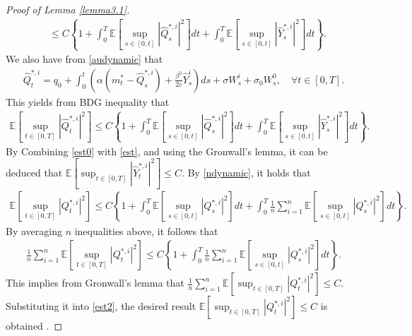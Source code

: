 \documentclass[11pt]{article}
\numberwithin{equation}{section}
\begin{document}
{\begin{proof}[Proof of Lemma \ref{lemma3.1}]
\begin{align}
&\leq C\left\{1+\int_0^T\mathbb{E}\left[\sup_{s\in [0,t]}|\hat{Q}_s^{*, i}|^2\right]dt+\int_0^T\mathbb{E}\left[\sup_{s\in [0,t]}|\hat{Y}_s^{*, i}|^2\right]dt\right\}.
\end{align}
We also have from \eqref{audynamic} that
\begin{align*}
\hat{Q}_t^{*,i}=q_0+\int_0^t\left(\alpha\left(m_t^*-\hat{Q}_s^{*, i}\right)+\frac{\beta ^2}{2c }\hat{Y}_s^ i\right)ds+\sigma  W_s^i+\sigma_0W_s^0,\quad \forall t\in[0,T].    
\end{align*}
This yields from BDG inequality that
\begin{align}\label{est}
\mathbb{E}\left[\sup_{t\in [0,T]}\left|\hat{Q}_t^{*, i}\right|^2\right]\leq C\left\{1+\int_0^T	\mathbb{E}\left[\sup_{s\in [0,t]}\left|\hat{Q}_s^{*, i}\right|^2\right]dt+\int_0^T\mathbb{E}\left[\sup_{s\in [0,t]}\left|\hat{Y}_s^{*,i}\right|^2\right]dt\right\}.
\end{align}
By Combining \eqref{est0} with \eqref{est}, and using the Gronwall's lemma,  it can be deduced that
$\mathbb{E}[\sup_{t\in [0,T]}|\hat{Y}_t^{*,i}|^2]\leq C$.
By \eqref{ndynamic}, it holds that
\begin{align}\label{est2}
\mathbb{E}\left[\sup_{t\in [0,T]}\left|Q_t^{*, i}\right|^2\right]\leq C\left\{1+\int_0^T	\mathbb{E}\left[\sup_{s\in [0,t]}\left|Q_s^{*, i}\right|^2\right]dt+\int_0^T	\frac{1}{n}\sum_{i=1}^n\mathbb{E}\left[\sup_{s\in [0,t]}\left|Q_s^{*,i}\right|^2\right]dt\right\}.
\end{align}
By averaging $n$ inequalities above, it follows that
\begin{align*}
\frac{1}{n}\sum_{i=1}^n\mathbb{E}\left[\sup_{t\in [0,T]}\left|Q_t^{*,i}\right|^2\right]\leq C\left\{1+\int_0^T	\frac{1}{n}\sum_{i=1}^n\mathbb{E}\left[\sup_{s\in [0,t]}\left|Q_s^{*,i}\right|^2\right]dt\right\}.
\end{align*}
This implies from Gronwall's lemma that $\frac{1}{n}\sum_{i=1}^n\mathbb{E}\left[\sup_{t\in [0,T]}|Q_t^{*, i}|^2\right]\leq C$. Substituting it into \eqref{est2}, the desired result $\mathbb{E}\left[\sup_{t\in [0,T]}|Q_t^{*, i}|^2\right]\leq C$ is obtained .


\end{proof}}
\end{document}
